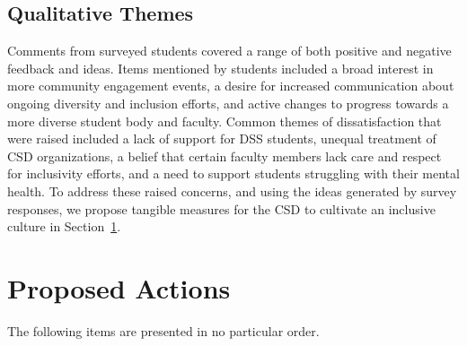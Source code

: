 \documentclass{article}
\begin{document}
\subsection{Qualitative Themes}
Comments from surveyed students covered a range of both positive and negative feedback and ideas. 
Items mentioned by students included
a broad interest in more community engagement events, a desire for increased communication about 
ongoing diversity and inclusion efforts, and active changes to progress towards a more 
diverse student body and faculty. Common themes of dissatisfaction that
were raised included a lack of support for DSS students, unequal treatment 
of CSD organizations, a belief that certain faculty members lack care and respect
for inclusivity efforts, and a need to support students struggling with their mental health. 
To address these raised concerns, and using the ideas generated by survey responses,
we propose tangible measures for the CSD to cultivate an inclusive culture in Section~\ref{proposed actions}.

\section{Proposed Actions}\label{proposed actions}
The following items are presented in no particular order.
\end{document}
